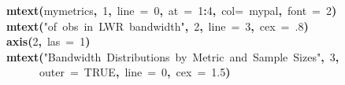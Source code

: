 \documentclass{article}
\makeatletter
\newcommand{\hlnumber}[1]{\textcolor[rgb]{0,0,0}{#1}}%
\newcommand{\hlfunctioncall}[1]{\textcolor[rgb]{0.501960784313725,0,0.329411764705882}{\textbf{#1}}}%
\newcommand{\hlstring}[1]{\textcolor[rgb]{0.6,0.6,1}{#1}}%
\newcommand{\hlkeyword}[1]{\textcolor[rgb]{0,0,0}{\textbf{#1}}}%
\newcommand{\hlargument}[1]{\textcolor[rgb]{0.690196078431373,0.250980392156863,0.0196078431372549}{#1}}%
\newcommand{\hlsymbol}[1]{\textcolor[rgb]{0,0,0}{#1}}%
\newcommand{\hlstd}[1]{\textcolor[rgb]{0,0,0}{#1}}%
\newenvironment{kframe}{%
 \def\FrameCommand##1{\hskip\@totalleftmargin \hskip-\fboxsep
 \colorbox{shadecolor}{##1}\hskip-\fboxsep
     \hskip-\linewidth \hskip-\@totalleftmargin \hskip\columnwidth}%
 \MakeFramed {\advance\hsize-\width
   \@totalleftmargin\z@ \linewidth\hsize
   \@setminipage}}%
 {\par\unskip\endMakeFramed}
\newenvironment{knitrout}{}{} %
\makeatother
\begin{document}
\begin{knitrout}
\begin{kframe}
\begin{flushleft}
\hlstd{}{\ }{\ }\hlfunctioncall{mtext}\hlkeyword{(}\hlsymbol{mymetrics}\hlkeyword{,}{\ }\hlnumber{1}\hlkeyword{,}{\ }\hlargument{line}{\ }\hlargument{=}{\ }\hlnumber{0}\hlkeyword{,}{\ }\hlargument{at}{\ }\hlargument{=}{\ }\hlnumber{1}\hlkeyword{:}\hlnumber{4}\hlkeyword{,}{\ }\hlargument{col}\hlargument{=}{\ }\hlsymbol{mypal}\hlkeyword{,}{\ }\hlargument{font}{\ }\hlargument{=}{\ }\hlnumber{2}\hlkeyword{)}\hspace*{\fill}\\
\hlstd{}{\ }{\ }\hlfunctioncall{mtext}\hlkeyword{(}\hlstring{"{}\usebox{\hlnormalsizeboxbackslash}\usebox{\hlnormalsizeboxbackslash}\usebox{\hlnormalsizeboxhash}{\ }of{\ }obs{\ }in{\ }LWR{\ }bandwidth"{}}\hlkeyword{,}{\ }\hlnumber{2}\hlkeyword{,}{\ }\hlargument{line}{\ }\hlargument{=}{\ }\hlnumber{3}\hlkeyword{,}{\ }\hlargument{cex}{\ }\hlargument{=}{\ }\hlnumber{.8}\hlkeyword{)}\hspace*{\fill}\\
\hlstd{}{\ }{\ }\hlfunctioncall{axis}\hlkeyword{(}\hlnumber{2}\hlkeyword{,}{\ }\hlargument{las}{\ }\hlargument{=}{\ }\hlnumber{1}\hlkeyword{)}\hspace*{\fill}\\
\hlstd{}{\ }{\ }\hlfunctioncall{mtext}\hlkeyword{(}\hlstring{"{}Bandwidth{\ }Distributions{\ }by{\ }Metric{\ }and{\ }Sample{\ }Sizes"{}}\hlkeyword{,}{\ }\hlnumber{3}\hlkeyword{,}\hspace*{\fill}\\
\hlstd{}{\ }{\ }{\ }{\ }{\ }{\ }{\ }{\ }\hlargument{outer}{\ }\hlargument{=}{\ }\hlnumber{TRUE}\hlkeyword{,}{\ }\hlargument{line}{\ }\hlargument{=}{\ }\hlnumber{0}\hlkeyword{,}{\ }\hlargument{cex}{\ }\hlargument{=}{\ }\hlnumber{1.5}\hlkeyword{)}\hspace*{\fill}\\
\hlstd{}\hspace*{\fill}\\
\hlstd{}\hlkeyword{\usebox{\hlnormalsizeboxclosebrace}}\mbox{}
\normalfont
\end{flushleft}
\end{kframe}\begin{figure}[]

\end{figure}
\end{knitrout}
\end{document}
